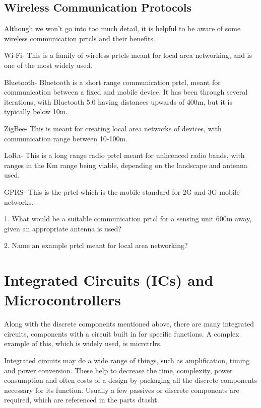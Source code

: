 \documentclass[a4paper,11pt]{report}
\newcommand{\Quiz}[1] %
{
\par\noindent %
\phantomsection %
\todo[inline, color=blue!30]{\textbf{#1}} %
\vspace{1em} %
}
\begin{document}
\vspace*{1\baselineskip}

\subsection{Wireless Communication Protocols}

Although we won't go into too much detail, it is helpful to be aware of some wireless communication \gls{prtcl}s and their benefits.

Wi-Fi- This is a family of wireless \gls{prtcl}s meant for local area networking, and is one of the most widely used.

Bluetooth- Bluetooth is a short range communication \gls{prtcl}, meant for communication between a fixed and mobile device. It has been through several iterations, with Bluetooth 5.0 having distances upwards of 400m, but it is typically below 10m.

ZigBee- This is meant for creating local area networks of devices, with communication range between 10-100m.

LoRa- This is a long range radio \gls{prtcl} meant for unlicenced radio bands, with ranges in the Km range being viable, depending on the landscape and antenna used.

GPRS- This is the \gls{prtcl} which is the mobile standard for 2G and 3G mobile networks.

\Quiz{Quiz}

1. What would be a suitable communication \gls{prtcl} for a sensing unit 600m away, given an appropriate antenna is used?

2. Name an example \gls{prtcl} meant for local area networking?

\pagebreak

\section{Integrated Circuits (ICs) and Microcontrollers}

Along with the discrete components mentioned above, there are many integrated circuits, components with a circuit built in for specific functions. A complex example of this, which is widely used, is \gls{micrctrlr}s.

Integrated circuits may do a wide range of things, such as amplification, timing and power conversion. These help to decrease the time, complexity, power consumption and often costs of a design by packaging all the discrete components necessary for its function. Usually a few passives or discrete components are required, which are referenced in the parts \gls{dtasht}.
\end{document}
